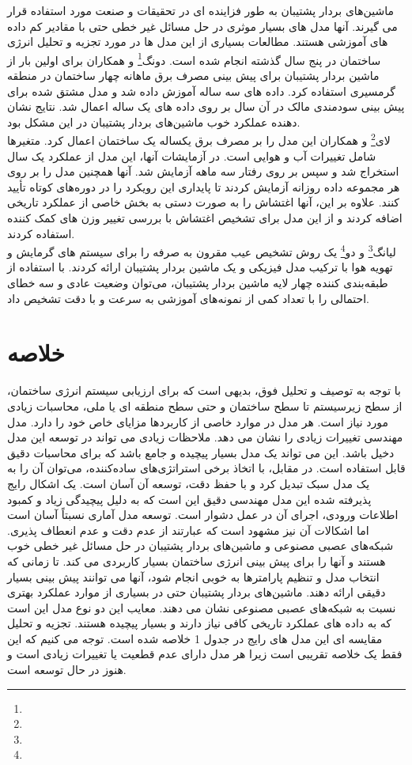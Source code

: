 ماشین‌های بردار پشتیبان به طور فزاینده ای در تحقیقات و صنعت مورد استفاده قرار می گیرند. آنها مدل های بسیار موثری در حل مسائل غیر خطی حتی با مقادیر کم داده های آموزشی هستند. مطالعات بسیاری از این مدل ها در مورد تجزیه و تحلیل انرژی ساختمان در پنج سال گذشته انجام شده است.
دونگ\footnote{} و همکاران \cite{dong2005applying} برای اولین بار از ماشین بردار پشتیبان برای پیش بینی مصرف برق ماهانه چهار ساختمان در منطقه گرمسیری استفاده کرد. داده های سه ساله آموزش داده شد و مدل مشتق شده برای پیش بینی سودمندی مالک در آن سال بر روی داده های یک ساله اعمال شد. نتایج نشان دهنده عملکرد خوب ماشین‌های بردار پشتیبان در این مشکل بود.
\\
لای\footnote{} و همکاران\cite{lai2008vapnik} این مدل را بر مصرف برق یکساله یک ساختمان اعمال کرد. متغیرها شامل تغییرات آب و هوایی است. در آزمایشات آنها، این مدل از عملکرد یک سال استخراج شد و سپس بر روی رفتار سه ماهه آزمایش شد. آنها همچنین مدل را بر روی هر مجموعه داده روزانه آزمایش کردند تا پایداری این رویکرد را در دوره‌های کوتاه تأیید کنند. علاوه بر این، آنها اغتشاش را به صورت دستی به بخش خاصی از عملکرد تاریخی اضافه کردند و از این مدل برای تشخیص اغتشاش با بررسی تغییر وزن های کمک کننده استفاده کردند.
\\
لیانگ\footnote{} و دو\footnote{} \cite{liang2007model} یک روش تشخیص عیب مقرون به صرفه را برای سیستم های گرمایش و تهویه هوا با ترکیب مدل فیزیکی و یک ماشین بردار پشتیبان ارائه کردند. با استفاده از طبقه‌بندی کننده چهار لایه ماشین بردار پشتیبان، می‌توان وضعیت عادی و سه خطای احتمالی را با تعداد کمی از نمونه‌های آموزشی به سرعت و با دقت تشخیص داد.


\section{خلاصه}

با توجه به توصیف و تحلیل فوق، بدیهی است که برای ارزیابی سیستم انرژی ساختمان، از سطح زیرسیستم تا سطح ساختمان و حتی سطح منطقه ای یا ملی، محاسبات زیادی مورد نیاز است. هر مدل در موارد خاصی از کاربردها مزایای خاص خود را دارد. مدل مهندسی تغییرات زیادی را نشان می دهد. ملاحظات زیادی می تواند در توسعه این مدل دخیل باشد. این می تواند یک مدل بسیار پیچیده و جامع باشد که برای محاسبات دقیق قابل استفاده است. در مقابل، با اتخاذ برخی استراتژی‌های ساده‌کننده، می‌توان آن را به یک مدل سبک تبدیل کرد و با حفظ دقت، توسعه آن آسان است. یک اشکال رایج پذیرفته شده این مدل مهندسی دقیق این است که به دلیل پیچیدگی زیاد و کمبود اطلاعات ورودی، اجرای آن در عمل دشوار است. توسعه مدل آماری نسبتاً آسان است اما اشکالات آن نیز مشهود است که عبارتند از عدم دقت و عدم انعطاف پذیری. شبکه‌های عصبی مصنوعی و ماشین‌های بردار پشتیبان در حل مسائل غیر خطی خوب هستند و آنها را برای پیش بینی انرژی ساختمان بسیار کاربردی می کند. تا زمانی که انتخاب مدل و تنظیم پارامترها به خوبی انجام شود، آنها می توانند پیش بینی بسیار دقیقی ارائه دهند. ماشین‌های بردار پشتیبان حتی در بسیاری از موارد عملکرد بهتری نسبت به شبکه‌های عصبی مصنوعی نشان می دهند\cite{li2010prediction}. معایب این دو نوع مدل این است که به داده های عملکرد تاریخی کافی نیاز دارند و بسیار پیچیده هستند. تجزیه و تحلیل مقایسه ای این مدل های رایج در جدول 1 خلاصه شده است. توجه می کنیم که این فقط یک خلاصه تقریبی است زیرا هر مدل دارای عدم قطعیت یا تغییرات زیادی است و هنوز در حال توسعه است.